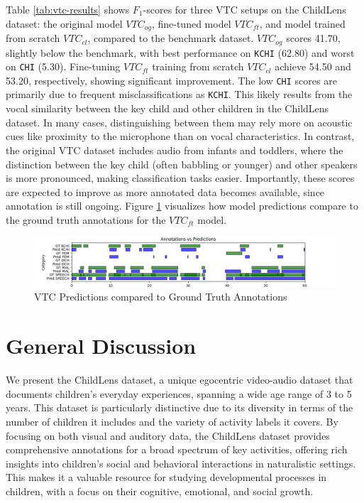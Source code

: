 \documentclass[
  man,floatsintext]{apa6}
\begin{document}
Table \ref{tab:vtc-results} shows \(F_1\)-scores for three VTC setups on the ChildLens dataset: the original model \(VTC_{og}\), fine-tuned model \(VTC_{ft}\), and model trained from scratch \(VTC_{cl}\), compared to the benchmark dataset. \(VTC_{og}\) scores 41.70, slightly below the benchmark, with best performance on \texttt{KCHI} (62.80) and worst on \texttt{CHI} (5.30). Fine-tuning \(VTC_{ft}\) training from scratch \(VTC_{cl}\) achieve 54.50 and 53.20, respectively, showing significant improvement. The low \texttt{CHI} scores are primarily due to frequent misclassifications as \texttt{KCHI}. This likely results from the vocal similarity between the key child and other children in the ChildLens dataset. In many cases, distinguishing between them may rely more on acoustic cues like proximity to the microphone than on vocal characteristics. In contrast, the original VTC dataset includes audio from infants and toddlers, where the distinction between the key child (often babbling or younger) and other speakers is more pronounced, making classification tasks easier. Importantly, these scores are expected to improve as more annotated data becomes available, since annotation is still ongoing. Figure \ref{fig:vtc-evaluations} visualizes how model predictions compare to the ground truth annotations for the \(VTC_{ft}\) model.

\begin{figure}

{\centering \includegraphics[width=6.67in]{images/vtc_performance_evaluation} 

}

\caption{VTC Predictions compared to Ground Truth Annotations}\label{fig:vtc-evaluations}
\end{figure}

\section{General Discussion}\label{general-discussion}

We present the ChildLens dataset, a unique egocentric video-audio dataset that documents children's everyday experiences, spanning a wide age range of 3 to 5 years. This dataset is particularly distinctive due to its diversity in terms of the number of children it includes and the variety of activity labels it covers. By focusing on both visual and auditory data, the ChildLens dataset provides comprehensive annotations for a broad spectrum of key activities, offering rich insights into children's social and behavioral interactions in naturalistic settings. This makes it a valuable resource for studying developmental processes in children, with a focus on their cognitive, emotional, and social growth.
\end{document}
